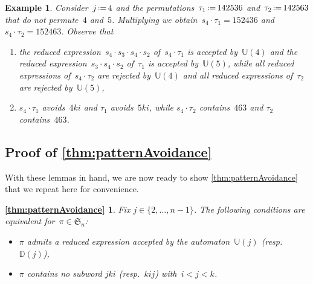 \documentclass{amsart}
\newtheorem{example}[theorem]{Example}
\newcommand{\fS}{\mathfrak{S}} %
\newcommand{\eqdef}{\mbox{\,\raisebox{0.2ex}{\scriptsize\ensuremath{\mathrm:}}\ensuremath{=}\,}} %
\newcommand{\automatonU}{\mathbb{U}} %
\newcommand{\automatonD}{\mathbb{D}} %
\begin{document}
\begin{example}\label{exm:lemVincent4}
Consider~$j \eqdef 4$ and the permutations~$\tau_1 \eqdef 142536$ and~$\tau_2 \eqdef 142563$ that do not permute~$4$ and~$5$. 
Multiplying we obtain~$s_4 \cdot \tau_1 = 152436$ and~$s_4 \cdot \tau_2 = 152463$. Observe that
\begin{enumerate}
	\item the reduced expression~$s_4 \cdot s_3 \cdot s_4 \cdot s_2$ of~$s_4 \cdot \tau_1$ is accepted by~$\automatonU(4)$ and the reduced expression~$s_3 \cdot s_4 \cdot s_2$ of~$\tau_1$ is accepted by~$\automatonU(5)$, while all reduced expressions of~$s_4 \cdot \tau_2$ are rejected by~$\automatonU(4)$ and all reduced expressions of~$\tau_2$ are rejected by~$\automatonU(5)$,
	\item $s_4 \cdot \tau_1$ avoids~$4ki$ and $\tau_1$ avoids~$5ki$, while $s_4 \cdot \tau_2$ contains~$463$ and $\tau_2$ contains~$463$.
\end{enumerate}
\end{example}

\subsection{Proof of \cref{thm:patternAvoidance}}

With these lemmas in hand, we are now ready to show \cref{thm:patternAvoidance} that we repeat here for convenience.

\newtheorem*{thm:patternAvoidance}{\cref{thm:patternAvoidance}}
\begin{thm:patternAvoidance}
Fix $j \in \{2, \dots, n-1\}$.
The following conditions are equivalent for~$\pi \in \fS_n$:
\begin{itemize}
	\item $\pi$ admits a reduced expression accepted by the automaton~$\automatonU(j)$ (resp.~$\automatonD(j)$),
	\item $\pi$ contains no subword $jki$ (resp.~$kij$) with~$i < j < k$.
\end{itemize}
\end{thm:patternAvoidance}
\end{document}
